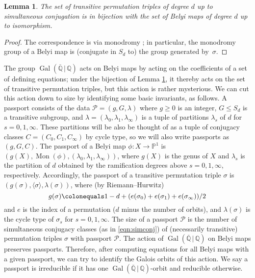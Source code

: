 \documentclass{dcthesis}
\newcommand{\PP}{\mathbb P}
\newcommand{\QQ}{\mathbb Q}
\newcommand{\defi}[1]{\textsf{#1}}
\DeclareMathOperator{\Mon}{Mon}
\DeclareMathOperator{\Gal}{Gal}
\newtheorem{lemma}[prop]{Lemma}
\theoremstyle{definition}
\theoremstyle{remark}
\numberwithin{equation}{section}
\numberwithin{figure}{section}
\begin{document}
{{{      \begin{lemma} \label{lem:simulisom}
        The set of transitive permutation triples of degree $d$ up to simultaneous
        conjugation is in bijection with the set of Belyi maps of degree $d$ up to
        isomorphism.
      \end{lemma}
      \begin{proof}
        The correspondence is via monodromy \cite[Lemma 1.1]{KMSV}; in particular,
        the monodromy group of a Belyi map is (conjugate in $S_d$ to) the group
        generated by~$\sigma$.
      \end{proof}
      The group $\Gal(\overline{\QQ}\,|\,\QQ)$ acts on Belyi maps by acting on the
      coefficients of a set of defining equations; under the bijection of Lemma
      \ref{lem:simulisom}, it thereby acts on the set of transitive permutation
      triples, but this action is rather mysterious.
      We can cut this action down to size by identifying some basic invariants, as
      follows.  A \defi{passport} consists of the data $\mathcal{P}=(g,G,\lambda)$
      where $g \geq 0$ is an integer, $G \leq S_d$ is a transitive subgroup, and
      $\lambda=(\lambda_0,\lambda_1,\lambda_\infty)$ is a tuple of partitions
      $\lambda_s$ of $d$ for $s=0,1,\infty$.  These partitions will be also be
      thought of as a tuple of conjugacy classes $C=(C_0,C_1,C_\infty)$ by cycle
      type, so we will also write passports as $(g,G,C)$.
      The \defi{passport} of a
      Belyi map $\phi\colon X \to \PP^1$ is $(g(X),\Mon(\phi),
      (\lambda_0,\lambda_1,\lambda_\infty))$,
      where $g(X)$ is the genus of $X$ and
      $\lambda_s$ is the partition of $d$ obtained by the ramification degrees above
      $s=0,1,\infty$, respectively.
      Accordingly, the \defi{passport} of a transitive
      permutation triple $\sigma$ is
      $(g(\sigma),\langle \sigma \rangle, \lambda(\sigma))$,
      where (by Riemann--Hurwitz)
      \begin{equation}\label{eqn:riemannhurwitzfortriples}
        g(\sigma) \colonequals 1-d+(e(\sigma_0)+e(\sigma_1)+e(\sigma_\infty))/2
      \end{equation}
      and $e$ is the index of a permutation ($d$ minus the number of orbits), and
      $\lambda(\sigma)$ is the cycle type of $\sigma_s$ for $s=0,1,\infty$. The
      \defi{size} of a passport $\mathcal{P}$ is the number of simultaneous conjugacy
      classes (as in \ref{eqn:simconj}) of (necessarily transitive) permutation
      triples $\sigma$ with passport $\mathcal{P}$.
      The action of $\Gal(\overline{\QQ}\,|\,\QQ)$ on Belyi maps preserves passports.
      Therefore, after computing equations for all Belyi maps with a given
      passport, we can try to identify the Galois orbits of this action.
      We say a passport is \defi{irreducible} if it has one
      $\Gal(\overline{\QQ}\,|\,\QQ)$-orbit and
      \defi{reducible} otherwise.
    }
  }
}
\end{document}
